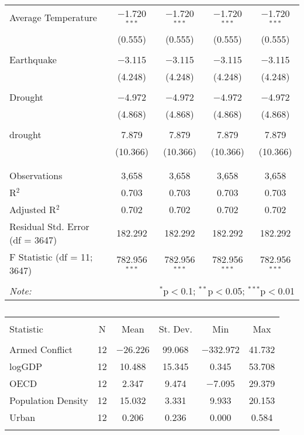 \begin{table}[!htbp]
\begin{tabular}{@{\extracolsep{5pt}}lcccc}
 Average Temperature & $-$1.720$^{***}$ & $-$1.720$^{***}$ & $-$1.720$^{***}$ & $-$1.720$^{***}$ \\ 
  & (0.555) & (0.555) & (0.555) & (0.555) \\ 
  & & & & \\ 
 Earthquake & $-$3.115 & $-$3.115 & $-$3.115 & $-$3.115 \\ 
  & (4.248) & (4.248) & (4.248) & (4.248) \\ 
  & & & & \\ 
 Drought & $-$4.972 & $-$4.972 & $-$4.972 & $-$4.972 \\ 
  & (4.868) & (4.868) & (4.868) & (4.868) \\ 
  & & & & \\ 
 drought & 7.879 & 7.879 & 7.879 & 7.879 \\ 
  & (10.366) & (10.366) & (10.366) & (10.366) \\ 
  & & & & \\ 
\hline \\[-1.8ex] 
Observations & 3,658 & 3,658 & 3,658 & 3,658 \\ 
R$^{2}$ & 0.703 & 0.703 & 0.703 & 0.703 \\ 
Adjusted R$^{2}$ & 0.702 & 0.702 & 0.702 & 0.702 \\ 
Residual Std. Error (df = 3647) & 182.292 & 182.292 & 182.292 & 182.292 \\ 
F Statistic (df = 11; 3647) & 782.956$^{***}$ & 782.956$^{***}$ & 782.956$^{***}$ & 782.956$^{***}$ \\ 
\hline 
\hline \\[-1.8ex] 
\textit{Note:}  & \multicolumn{4}{r}{$^{*}$p$<$0.1; $^{**}$p$<$0.05; $^{***}$p$<$0.01} \\ 
\end{tabular} 
\end{table} 

\begin{table}[!htbp] \centering 
  \caption{} 
  \label{} 
\begin{tabular}{@{\extracolsep{5pt}}lccccc} 
\\[-1.8ex]\hline 
\hline \\[-1.8ex] 
Statistic & \multicolumn{1}{c}{N} & \multicolumn{1}{c}{Mean} & \multicolumn{1}{c}{St. Dev.} & \multicolumn{1}{c}{Min} & \multicolumn{1}{c}{Max} \\ 
\hline \\[-1.8ex] 
Armed Conflict & 12 & $-$26.226 & 99.068 & $-$332.972 & 41.732 \\ 
logGDP & 12 & 10.488 & 15.345 & 0.345 & 53.708 \\ 
OECD & 12 & 2.347 & 9.474 & $-$7.095 & 29.379 \\ 
Population Density & 12 & 15.032 & 3.331 & 9.933 & 20.153 \\ 
Urban & 12 & 0.206 & 0.236 & 0.000 & 0.584 \\ 
\hline \\[-1.8ex] 
\end{tabular} 
\end{table} 

